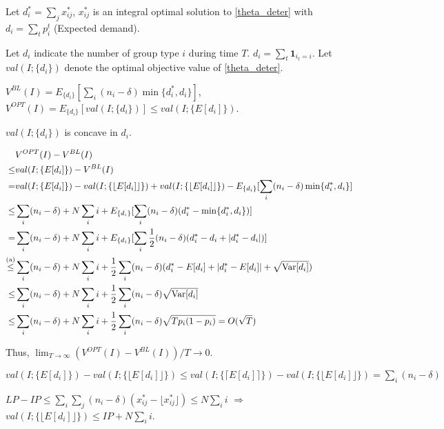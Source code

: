 Let $d_{i}^{*} = \sum_{j} x_{ij}^{*}$, $x_{ij}^{*}$ is an integral optimal solution to \eqref{theta_deter} with $d_{i} = \sum_{t} p_{i}^{t}$ (Expected demand).

Let $d_{i}$ indicate the number of group type $i$ during time $T$. $d_{i} = \sum_{t} \bm{1}_{i_{t} = i}$.
Let $val(I; \{d_{i}\})$ denote the optimal objective value of \eqref{theta_deter}.

$V^{BL}(I) = E_{\{d_{i}\}}[\sum_{i} (n_{i}-\delta) \min\{d_{i}^{*}, d_{i}\}]$, $V^{OPT}(I) = E_{\{d_{i}\}} [val(I; \{d_{i}\})] \leq val(I; \{E[d_{i}]\})$.

$val(I; \{d_{i}\})$ is concave in $d_{i}$.

\begin{align*}
   & V^{OPT}(I) - V^{BL}(I) \\
\leq & val(I; \{E[d_{i}]\}) - V^{BL}(I) \\
= & val(I; \{E[d_{i}]\}) - val(I; \{\lfloor E[d_{i}]\rfloor\}) + val(I; \{\lfloor E[d_{i}]\rfloor\}) - E_{\{d_{i}\}}[\sum_{i} (n_{i}-\delta) \min\{d_{i}^{*}, d_{i}\}] \\
\leq & \sum_{i} (n_{i} - \delta) + N \sum_{i} i + E_{\{d_{i}\}}[\sum_{i} (n_{i}-\delta) (d_{i}^{*} - \min\{d_{i}^{*}, d_{i}\})] \\
= & \sum_{i} (n_{i} - \delta) + N \sum_{i} i + E_{\{d_{i}\}}[\sum_{i} \frac{1}{2}(n_{i}-\delta) (d_{i}^{*} - d_{i} + |d_{i}^{*} - d_{i}|)] \\
\overset{\text{(a)}}{\leq} & \sum_{i} (n_{i} - \delta) + N \sum_{i} i + \frac{1}{2} \sum_{i} (n_{i}-\delta)(d_{i}^{*} - E[d_{i}] + |d_{i}^{*} - E[d_{i}]| + \sqrt{\operatorname{{Var}}[d_{i}]}) \\
\leq & \sum_{i} (n_{i} - \delta) + N \sum_{i} i + \frac{1}{2} \sum_{i} (n_{i}-\delta) \sqrt{\operatorname{{Var}}[d_{i}]} \\
\leq & \sum_{i} (n_{i} - \delta) + N \sum_{i} i + \frac{1}{2} \sum_{i} (n_{i}-\delta) \sqrt{T p_{i} (1- p_{i})} = O(\sqrt{T})
\end{align*}

Thus, $\lim_{T \to \infty} (V^{OPT}(I) - V^{BL}(I))/T \to 0$.

$val(I; \{E[d_{i}]\}) - val(I; \{\lfloor E[d_{i}]\rfloor\}) \leq val(I; \{\lceil E[d_{i}]\rceil\}) - val(I; \{\lfloor E[d_{i}]\rfloor\}) = \sum_{i} (n_{i} - \delta)$


$LP -IP \leq \sum_{i} \sum_{j} (n_{i} - \delta) (x_{ij}^{*} - \lfloor x_{ij}^{*} \rfloor) \leq N \sum_{i} i$ $\Rightarrow$ $val(I; \{\lfloor E[d_{i}]\rfloor\}) \leq IP + N \sum_{i} i$.


